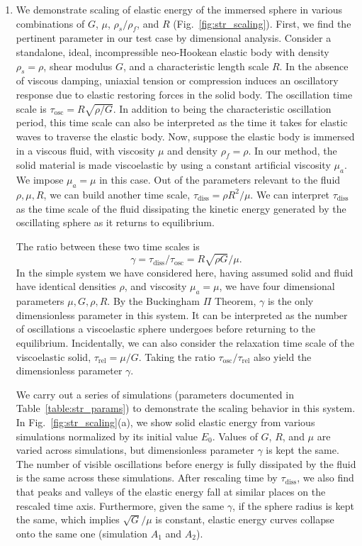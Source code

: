 \documentclass[times, 10pt]{article}
\begin{document}
\begin{enumerate}
		\item We demonstrate scaling of elastic energy of the immersed sphere in various combinations of $G$, $\mu$, $\rho_s/\rho_f$, and $R$ (Fig.~\ref{fig:str_scaling}). First, we find the pertinent parameter in our test case by dimensional analysis.
		Consider a standalone, ideal, incompressible neo-Hookean elastic body with density $\rho_s=\rho$, shear modulus $G$, and a characteristic length scale $R$.
		In the absence of viscous damping, uniaxial tension or compression induces an oscillatory response due to elastic restoring forces in the solid body.
		The oscillation time scale is $\tau_\text{osc} = R\sqrt{\rho/G}$.
		In addition to being the characteristic oscillation period, this time scale can also be interpreted as the time it takes for elastic waves to traverse the elastic body.
		Now, suppose the elastic body is immersed in a viscous fluid, with viscosity $\mu$ and density $\rho_f = \rho$.
		In our method, the solid material is made viscoelastic by using a  constant artificial viscosity $\mu_a$.
		We impose $\mu_a = \mu$ in this case.
		Out of the parameters relevant to the fluid $\rho, \mu, R$, we can build another time scale, $\tau_\text{diss} = \rho R^2 / \mu$.
		We can interpret $\tau_\text{diss}$ as the time scale of the fluid dissipating the kinetic energy generated by the oscillating sphere as it returns to equilibrium.

		\qquad The ratio between these two time scales is
		$$\gamma = \tau_\text{diss} / \tau_\text{osc} = {R \sqrt{\rho G}}/{\mu}.$$
		In the simple system we have considered here, having assumed solid and fluid have identical densities $\rho$, and viscosity $\mu_a = \mu$, we have four dimensional parameters $\mu, G, \rho, R$.
		By the Buckingham $\Pi$ Theorem, $\gamma$ is the only dimensionless parameter in this system.
		It can be interpreted as the number of oscillations a viscoelastic sphere undergoes before returning to the equilibrium.
		Incidentally, we can also consider the relaxation time scale of the viscoelastic solid, $\tau_\text{rel} = \mu / G$.
		Taking the ratio $\tau_\text{osc} / \tau_\text{rel}$ also yield the dimensionless parameter $\gamma$.

		\qquad We carry out a series of simulations (parameters documented in Table~\ref{table:str_params}) to demonstrate the scaling behavior in this system.
		In Fig.~\ref{fig:str_scaling}(a), we show solid elastic energy from various simulations normalized by its initial value $E_0$.
		Values of $G$, $R$, and $\mu$ are varied across simulations, but dimensionless parameter $\gamma$ is kept the same.
		The number of visible oscillations before energy is fully dissipated by the fluid is the same across these simulations.
		After rescaling time by $\tau_\text{diss}$, we also find that peaks and valleys of the elastic energy fall at similar places on the rescaled time axis.
		Furthermore, given the same $\gamma$, if the sphere radius is kept the same, which implies $\sqrt{G} / \mu$ is constant, elastic energy curves collapse onto the same one (simulation $A_1$ and $A_2$).


\end{enumerate}
\end{document}
